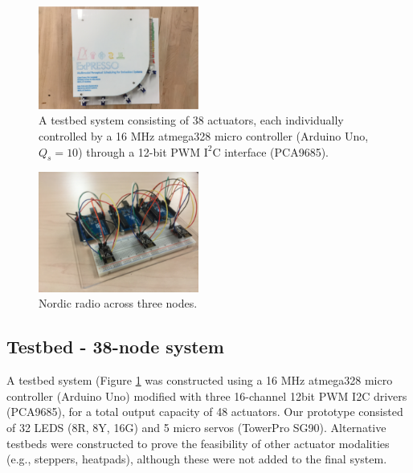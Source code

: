 \documentclass{sigchi}
\begin{document}
    \begin{figure}[t]
      \centering
      \includegraphics[keepaspectratio, width=0.47\textwidth]{figures/testbed.pdf}
      \caption{ A testbed system consisting of 38 actuators, each individually controlled by a 16 MHz atmega328 micro controller (Arduino Uno, $Q_s = 10$) through a 12-bit PWM $\text{I}^2$C interface (PCA9685). }
      \label{fig:testbed} 
    \end{figure}


     \begin{figure}[t]
      \centering
      \includegraphics[keepaspectratio, width=0.47\textwidth]{figures/nordictestbed.jpg}
      \caption{ Nordic radio across three nodes. }
      \label{fig:testbednordic} 
    \end{figure}



  \subsection{Testbed - 38-node system}
  A testbed system (Figure \ref{fig:testbed} was constructed using a 16 MHz atmega328 micro controller (Arduino Uno) modified with three 16-channel 12bit PWM I2C drivers (PCA9685), for a total output capacity of 48 actuators. Our prototype consisted of 32 LEDS (8R, 8Y, 16G) and 5 micro servos (TowerPro SG90). Alternative testbeds were constructed to prove the feasibility of other actuator modalities (e.g., steppers, heatpads), although these were not added to the final system. 

  
\end{document}

